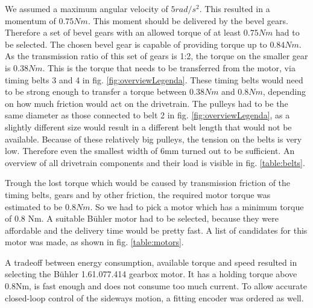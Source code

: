 \documentclass[technical_document.tex]{subfiles}
\begin{document}
We assumed a maximum angular velocity of $5 rad/s^2$. This resulted in a momentum of $0.75Nm$. This moment should be delivered by the bevel gears. Therefore a set of bevel gears with an allowed torque of at least $0.75Nm$ had to be selected. The chosen bevel gear is capable of providing torque up to $0.84Nm$. As the transmission ratio of this set of gears is 1:2, the torque on the smaller gear is $0.38Nm$. This is the torque that needs to be transferred from the motor, via timing belts 3 and 4 in fig. \ref{fig:overviewLegenda}. These timing belts would need to be strong enough to transfer a torque between $0.38Nm$ and $0.8Nm$, depending on how much friction would act on the drivetrain. The pulleys had to be the same diameter as those connected to belt 2 in fig. \ref{fig:overviewLegenda}, as a slightly different size would result in a different belt length that would not be available. Because of these relatively big pulleys, the tension on the belts is very low. Therefore even the smallest width of 6mm turned out to be sufficient. An overview of all drivetrain components and their load is visible in fig. \ref{table:belts}.


Trough the lost torque which would be caused by transmission friction of the timing belts, gears and by other friction, the required motor torque was estimated to be $0.8Nm$. So we had to pick a motor which has a minimum torque of 0.8 Nm. A suitable B\"{u}hler motor had to be selected, because they were affordable and the delivery time would be pretty fast. 
A list of candidates for this motor was made, as shown in fig. \ref{table:motors}.


A tradeoff between energy consumption, available torque and speed resulted in selecting the B\"{u}hler 1.61.077.414 gearbox motor. It has a holding torque above 0.8Nm, is fast enough and does not consume too much current. To allow accurate closed-loop control of the sideways motion, a fitting encoder was ordered as well.
\end{document}
